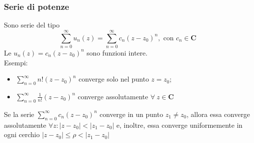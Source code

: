 \subsubsection*{Serie di potenze}
Sono serie del tipo
\[
    \displaystyle \sum_{n=0}^\infty u_n(z) = \sum_{n=0}^\infty c_n(z-z_0)^n,\text{ con }c_n\in\mathbf{C}
\]
Le $u_n(z)=c_n(z-z_0)^n$ sono funzioni intere.\\
Esempi:\\
\begin{itemize}
    \item $\displaystyle \sum_{n=0}^\infty n!(z-z_0)^n$ converge solo nel punto $z=z_0$;
    \item $\displaystyle \sum_{n=0}^\infty \frac{1}{n!}(z-z_0)^n$ converge assolutamente $\forall\ z\in \mathbf{C}$
\end{itemize}
\begin{theorem}[di Abel]
    Se la serie $\displaystyle \sum_{n=0}^\infty c_n(z-z_0)^n$ converge in un punto $z_1\neq z_0$, allora essa converge assolutamente $\forall z : |z-z_0|<|z_1-z_0|$ e, inoltre, essa converge uniformemente in ogni cerchio $|z-z_0|\le\rho<|z_1-z_0|$
\end{theorem}